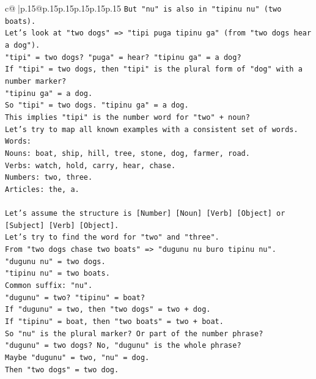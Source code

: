 \documentclass{article}
\begin{document}
{\begin{supertabular}{c@{$\;$}|p{.15\linewidth}@{}p{.15\linewidth}p{.15\linewidth}p{.15\linewidth}p{.15\linewidth}p{.15\linewidth}}
{{{\texttt{But "nu" is also in "tipinu nu" (two boats).} \\
\texttt{Let's look at "two dogs" => "tipi puga tipinu ga" (from "two dogs hear a dog").} \\
\texttt{"tipi" = two dogs? "puga" = hear? "tipinu ga" = a dog?} \\
\texttt{If "tipi" = two dogs, then "tipi" is the plural form of "dog" with a number marker?} \\
\texttt{"tipinu ga" = a dog.} \\
\texttt{So "tipi" = two dogs. "tipinu ga" = a dog.} \\
\texttt{This implies "tipi" is the number word for "two" + noun?} \\
\texttt{Let's try to map all known examples with a consistent set of words.} \\
\texttt{Words:} \\
\texttt{Nouns: boat, ship, hill, tree, stone, dog, farmer, road.} \\
\texttt{Verbs: watch, hold, carry, hear, chase.} \\
\texttt{Numbers: two, three.} \\
\texttt{Articles: the, a.} \\
\\ 
\texttt{Let's assume the structure is {[}Number{]} {[}Noun{]} {[}Verb{]} {[}Object{]} or {[}Subject{]} {[}Verb{]} {[}Object{]}.} \\
\texttt{Let's try to find the word for "two" and "three".} \\
\texttt{From "two dogs chase two boats" => "dugunu nu buro tipinu nu".} \\
\texttt{"dugunu nu" = two dogs.} \\
\texttt{"tipinu nu" = two boats.} \\
\texttt{Common suffix: "nu".} \\
\texttt{"dugunu" = two? "tipinu" = boat?} \\
\texttt{If "dugunu" = two, then "two dogs" = two + dog.} \\
\texttt{If "tipinu" = boat, then "two boats" = two + boat.} \\
\texttt{So "nu" is the plural marker? Or part of the number phrase?} \\
\texttt{"dugunu" = two dogs? No, "dugunu" is the whole phrase?} \\
\texttt{Maybe "dugunu" = two, "nu" = dog.} \\
\texttt{Then "two dogs" = two dog.} \\
}}}
\end{supertabular}}
\end{document}
